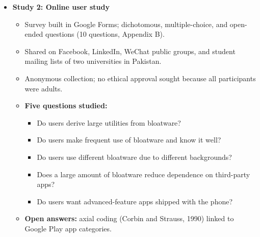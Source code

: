 \documentclass[11pt,a4paper]{article}
\begin{document}
\begin{enumerate}
\begin{itemize}[leftmargin=*, itemsep=1pt, topsep=2pt]
\begin{itemize}[itemsep=0pt]
        \end{itemize}
        \item \textbf{Study 2: Online user study}
        \begin{itemize}[itemsep=0pt]
            \item Survey built in Google Forms; dichotomous, multiple-choice, and open-ended questions (10 questions, Appendix B).
            \item Shared on Facebook, LinkedIn, WeChat public groups, and student mailing lists of two universities in Pakistan.
            \item Anonymous collection; no ethical approval sought because all participants were adults.
            \item \textbf{Five questions studied:}
            \begin{itemize}[itemsep=0pt]
                \item Do users derive large utilities from bloatware?
                \item Do users make frequent use of bloatware and know it well?
                \item Do users use different bloatware due to different backgrounds?
                \item Does a large amount of bloatware reduce dependence on third-party apps?
                \item Do users want advanced-feature apps shipped with the phone?
            \end{itemize}
            \item \textbf{Open answers:} axial coding (Corbin and Strauss, 1990) linked to Google Play app categories.
        \end{itemize}
    \end{itemize}


\end{enumerate}
\end{document}
